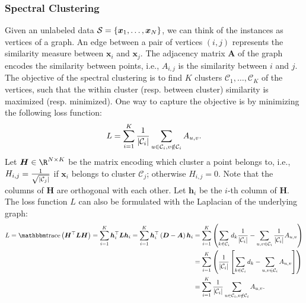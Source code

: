     \subsubsection{Spectral Clustering}
        Given an unlabeled data $\mathcal{S}=\{ \bm{x}_1, \ldots, \bm{x}_N \}$, we can think of the \ndata instances as \ndata vertices of a graph.
        An edge between a pair of vertices $(i, j)$ represents the similarity measure between $\bm{x}_i$ and $\bm{x}_j$.
        The adjacency matrix $\bm{A}$ of the graph encodes the similarity between points, i.e., $A_{i,j}$ is the similarity between $i$ and $j$.
        The objective of the spectral clustering is to find $K$ clusters $\mathcal{C}_1, \ldots, \mathcal{C}_K$ of the vertices, such that the within cluster (resp. between cluster) similarity is maximized (resp. minimized).
        One way to capture the objective is by minimizing the following loss function:
            \begin{equation}
                L = \sum_{i=1}^{K}{\frac{1}{| \mathcal{C}_i |} \sum_{u \in \mathcal{C}_i, v \notin \mathcal{C}_i}^{}{A_{u, v}}}.
            \end{equation}
        Let $\bm{H} \in \R^{\ndata \times K}$ be the matrix encoding which cluster a point belongs to, i.e., $H_{i,j}=\frac{1}{\sqrt{| \mathcal{C}_j |}}$ if $\bm{x}_i$ belongs to cluster $\mathcal{C}_j$; otherwise $H_{i,j}=0$.
        Note that the columns of $\bm{H}$ are orthogonal with each other. 
        Let $\bm{h}_i$ be the $i$-th column of $\bm{H}$.
        The loss function $L$ can also be formulated with the Laplacian of the underlying graph:
            \begin{equation}
                \begin{aligned}
                    L  = \Tr\left( \bm{H}^\top \bm{L} \bm{H}  \right) = \sum_{i=1}^{K}{\bm{h}_i^\top \bm{L} \bm{h}_i} 
                      = \sum_{i=1}^{K}{\bm{h}_i^\top \left( \bm{D} - \bm{A} \right) \bm{h}_i} & = \sum_{i=1}^{K}{\left(   \sum_{k \in \mathcal{C}_i}^{}{d_k \frac{1}{\SetCard{\mathcal{C}_i}}} - \sum_{u, v \in \mathcal{C}_i}^{}{\frac{1}{\SetCard{\mathcal{C}_i}}A_{u, v}} 
                      \right)} \\
                      & =   \sum_{i=1}^{K}{\left( \frac{1}{\SetCard{\mathcal{C}_i}} \left[ \sum_{k \in \mathcal{C}_i}^{}{d_k} - \sum_{u, v \in \mathcal{C}_i}^{}{A_{u, v}} \right] \right)} \\
                      & = \sum_{i=1}^{K}{\frac{1}{\SetCard{\mathcal{C}_i}} \sum_{u \in \mathcal{C}_i, v\notin \mathcal{C}_i}^{}{A_{u,v}}}.
                \end{aligned}
            \end{equation}
